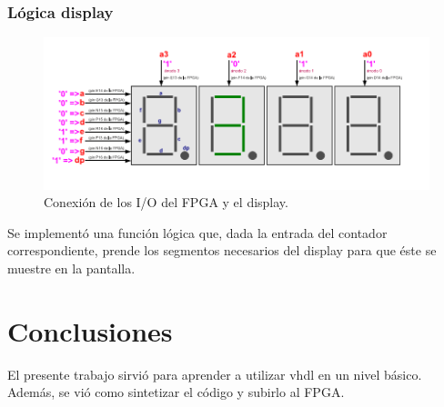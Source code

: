 \documentclass[a4paper,10pt]{article}
\begin{document}
\subsubsection{Lógica display}
\begin{figure}[h]
	\centering
	\includegraphics{img/display.png}
	\caption{Conexión de los I/O del FPGA y el display.}
\end{figure}
Se implementó una función lógica que, dada la entrada del contador correspondiente, prende los segmentos necesarios del display para que éste se muestre en la pantalla.


\section{Conclusiones}
El presente trabajo sirvió para aprender a utilizar vhdl en un nivel básico. Además, se vió como sintetizar el código y subirlo al FPGA.

\end{document}
